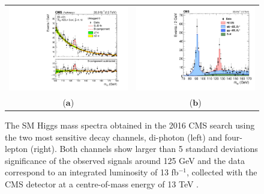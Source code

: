 \begin{figure}[htp]
\centering
\begin{tabular}{cc}
\hspace{-0.3cm}
\includegraphics[scale=0.35]{fig/chapt2/CMS-PAS-Htogamma.pdf}
& \hspace{-0.5cm} \includegraphics[scale=0.35]{fig/chapt2/CMS-PAS-Hto4l.pdf}\\
   ($\mathbf{a}$)\qquad&($\mathbf{b}$)\qquad\\
\end{tabular}
\caption{\label{fig:sm_higgs}The SM Higgs mass spectra obtained in the 2016 CMS search using the two most sensitive decay channels, di-photon (left) and four-lepton (right). Both channels show larger than 5 standard deviations significance of the observed signals around 125 GeV and the data correspond to an integrated luminosity of 13 fb$^{-1}$, collected with the CMS detector at a centre-of-mass energy of 13 TeV \cite{pub:sm_higgs4l,pub:sm_higgs2gamma}.}
\end{figure} 

